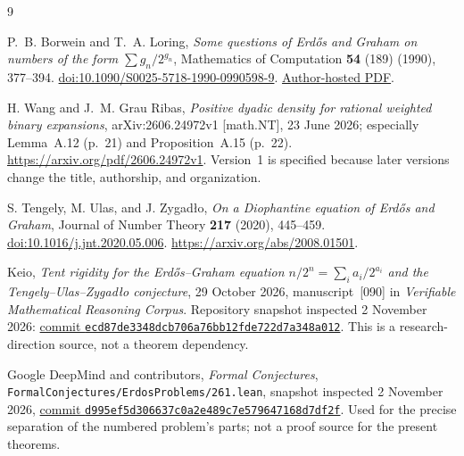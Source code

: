 \documentclass[11pt]{article}
\theoremstyle{definition}
\theoremstyle{remark}
\begin{document}
\begin{thebibliography}{9}
\raggedright
{}
P.~B. Borwein and T.~A. Loring,
\emph{Some questions of Erd\H{o}s and Graham on numbers of the form
$\sum g_n/2^{g_n}$},
Mathematics of Computation \textbf{54} (189) (1990), 377--394.
\href{https://doi.org/10.1090/S0025-5718-1990-0990598-9}{doi:10.1090/S0025-5718-1990-0990598-9}.
\href{https://www.cecm.sfu.ca/~pborwein/PAPERS/P46.pdf}{Author-hosted PDF}.

H. Wang and J.~M. Grau Ribas,
\emph{Positive dyadic density for rational weighted binary expansions},
arXiv:2606.24972v1 [math.NT], 23 June 2026;
especially Lemma~A.12 (p.~21) and Proposition~A.15 (p.~22).
\url{https://arxiv.org/pdf/2606.24972v1}.
Version~1 is specified because later versions change the title,
authorship, and organization.

S. Tengely, M. Ulas, and J. Zygad\l{}o,
\emph{On a Diophantine equation of Erd\H{o}s and Graham},
Journal of Number Theory \textbf{217} (2020), 445--459.
\href{https://doi.org/10.1016/j.jnt.2020.05.006}{doi:10.1016/j.jnt.2020.05.006}.
\url{https://arxiv.org/abs/2008.01501}.

Keio, \emph{Tent rigidity for the Erd\H{o}s--Graham equation
$n/2^n=\sum_i a_i/2^{a_i}$ and the Tengely--Ulas--Zygad\l{}o conjecture},
29 October 2026, manuscript~[090] in
\emph{Verifiable Mathematical Reasoning Corpus}.
Repository snapshot inspected 2 November 2026:
\href{https://github.com/QEEDDD/Verifiable-Mathematical-Reasoning-Corpus/tree/ecd87de3348dcb706a76bb12fde722d7a348a012}{commit \texttt{ecd87de3348dcb706a76bb12fde722d7a348a012}}.
This is a research-direction source, not a theorem dependency.

Google DeepMind and contributors, \emph{Formal Conjectures},
\nolinkurl{FormalConjectures/ErdosProblems/261.lean},
snapshot inspected 2 November 2026,
\href{https://github.com/google-deepmind/formal-conjectures/blob/d995ef5d306637c0a2e489c7e579647168d7df2f/FormalConjectures/ErdosProblems/261.lean}{commit \texttt{d995ef5d306637c0a2e489c7e579647168d7df2f}}.
Used for the precise separation of the numbered problem's parts;
not a proof source for the present theorems.
\end{thebibliography}
\end{document}
